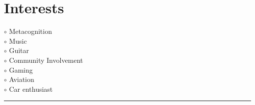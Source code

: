 \documentclass[10pt,a4paper,ragged2e,withhyper]{altacv}
\newcommand{\MyVerticalRule}{
		\textcolor{ColorOne}
		{
		  \rule
		  	{1pt}
		  	{\textheight}
		}
	}
\begin{document}
\begin{adjustbox}{valign=t}
\begin{minipage}{0.3\textwidth}
            \section*{Interests} 
            \textcolor{ColorOne}{$\circ$} Metacognition \\
            \textcolor{ColorOne}{$\circ$} Music \\
            \textcolor{ColorOne}{$\circ$} Guitar \\
            \textcolor{ColorOne}{$\circ$} Community Involvement \\
            \textcolor{ColorOne}{$\circ$} Gaming \\
            \textcolor{ColorOne}{$\circ$} Aviation \\
            \textcolor{ColorOne}{$\circ$} Car enthusiast \\
    \end{minipage} 
    \end{adjustbox}
    \begin{adjustbox}{valign=t}
        \begin{minipage}{0.05\textwidth} %
        \MyVerticalRule  
        \end{minipage}
    \end{adjustbox} 
\end{document}

